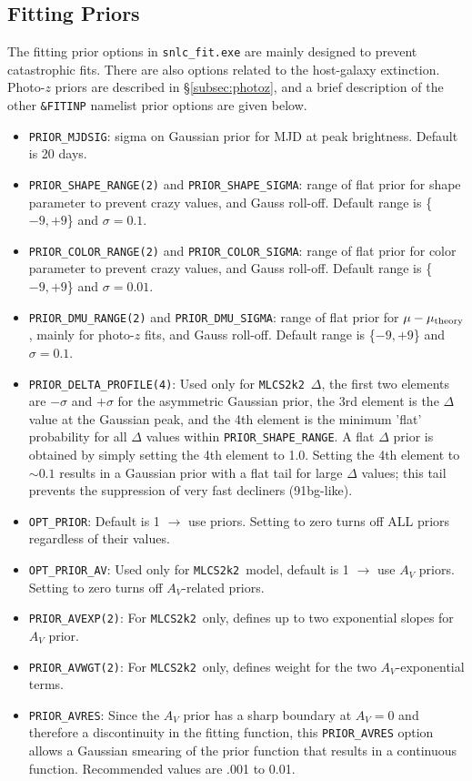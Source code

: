\documentclass[12pt]{article}
\newcommand{\mlcs}{{\tt MLCS2k2}}
\begin{document}
   \subsection{Fitting Priors}
   \label{subsec:priors}

The fitting prior options in {\tt snlc\_fit.exe} are mainly 
designed to prevent catastrophic fits. There are also
options related to the host-galaxy extinction.
Photo-$z$ priors are described in \S\ref{subsec:photoz},
and a brief description of the other {\tt \&FITINP}
namelist prior options are given below.
%
\begin{itemize}  %
  \item \verb|PRIOR_MJDSIG|:
    sigma on Gaussian prior for MJD at peak brightness.
    Default is 20 days.
%
  \item \verb|PRIOR_SHAPE_RANGE(2)|  and \verb|PRIOR_SHAPE_SIGMA|: 
    range of flat prior for shape parameter to prevent crazy values,
    and Gauss roll-off. Default range is \{$-9,+9$\} and $\sigma=0.1$.
%
  \item \verb|PRIOR_COLOR_RANGE(2)|  and \verb|PRIOR_COLOR_SIGMA|: 
    range of flat prior for color parameter to prevent crazy values,
    and Gauss roll-off. Default range is \{$-9,+9$\} and $\sigma=0.01$.
%
  \item \verb|PRIOR_DMU_RANGE(2)|  and \verb|PRIOR_DMU_SIGMA|: 
    range of flat prior for $\mu-\mu_{\rm theory}$, mainly for photo-$z$ fits,
    and Gauss roll-off. Default range is \{$-9,+9$\} and $\sigma=0.1$.
%
  \item \verb|PRIOR_DELTA_PROFILE(4)|:
    Used only for \mlcs\ $\Delta$,  
    the first two elements are $-\sigma$ and $+\sigma$
    for the asymmetric Gaussian prior, the 3rd element is
    the $\Delta$ value at the Gaussian peak,
    and the 4th element is the minimum 'flat'  probability
    for all $\Delta$ values within \verb|PRIOR_SHAPE_RANGE|.
    A flat $\Delta$ prior is obtained by simply setting the 
    4th element to 1.0. Setting the 4th element to $\sim 0.1$
    results in a Gaussian prior with a flat tail for large 
    $\Delta$ values; this tail prevents the suppression of
    very fast decliners (91bg-like).
%
  \item \verb|OPT_PRIOR|: Default is 1 $\to$ use priors.
    Setting to zero turns off ALL priors regardless of their values.
%
  \item \verb|OPT_PRIOR_AV|: 
    Used only for \mlcs\ model, default is 1 $\to$ use $A_V$ priors.
    Setting to zero turns off $A_V$-related priors.
%
 \item \verb|PRIOR_AVEXP(2)|:
   For \mlcs\ only, defines up to two exponential slopes for $A_V$ prior.
%
 \item \verb|PRIOR_AVWGT(2)|:
   For \mlcs\ only, defines weight for the two $A_V$-exponential terms.
%
 \item \verb|PRIOR_AVRES|:
   Since the $A_V$ prior has a sharp boundary at $A_V=0$ and therefore
   a discontinuity in the fitting function, this {\tt PRIOR\_AVRES}
   option allows a Gaussian smearing of the prior function that results
   in a continuous function. Recommended values are .001 to 0.01.
\end{itemize}
\end{document}
